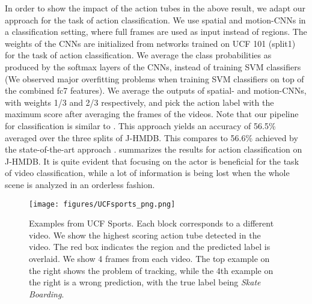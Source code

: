 \documentclass[10pt,twocolumn,letterpaper]{article}
\begin{document}
In order to show the impact of the action tubes in the above result, we adapt our approach for the task of action classification. We use spatial and motion-CNNs in a classification setting, where full frames are used as input instead of regions. The weights of the CNNs are initialized from networks trained on UCF 101 (split1) for the task of action classification. We average the class probabilities as produced by the softmax layers of the CNNs, instead of training SVM classifiers (We observed major overfitting problems when training SVM classifiers on top of the combined fc7 features). We average the outputs of spatial- and motion-CNNs, with weights 1/3 and 2/3 respectively, and pick the action label with the maximum score after averaging the frames of the videos. Note that our pipeline for classification is similar to \cite{simonyan2014}. This approach yields an accuracy of 56.5\% averaged over the three splits of J-HMDB. This compares to 56.6\% achieved by the  state-of-the-art approach \cite{wang2011}.  summarizes the results for action classification on J-HMDB. It is quite evident that focusing on the actor is beneficial for the task of video classification, while a lot of information is being lost when the whole scene is analyzed in an orderless fashion.

\begin{table}[t!]
\centering
\renewcommand{\arraystretch}{1.2}
\renewcommand{\tabcolsep}{1.2mm}
\vspace{0.1em}
\caption{Classification accuracy on J-HMDB (averaged over the three splits). CNN (third column) shows the result of the weighted average of spatial and motion-CNN on the whole frames, while Action Tubes (fourth column) shows the result after using the scores of the predicted action tubes to make decisions for the video's label.}
\vspace{-0.5em}
\end{table}

\begin{figure*}[t]
\begin{center}
\texttt{[image: figures/UCFsports\_png.png]}
\end{center}
   \caption{Examples from UCF Sports. Each block corresponds to a different video. We show the highest scoring action tube detected in the video. The red box indicates the region and the predicted label is overlaid. We show 4 frames from each video. The top example on the right shows the problem of tracking, while the 4th example on the right is a wrong prediction, with the true label being \textit{Skate Boarding}.} 
\end{figure*}
\end{document}
